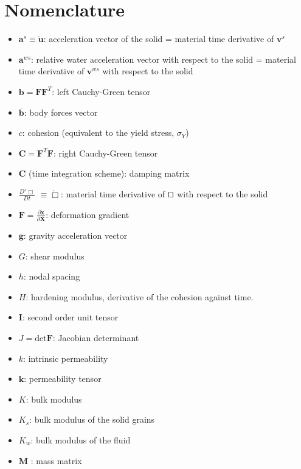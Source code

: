 \documentclass[twocolumn]{svjour3}          %
\begin{document}
\appendix

{}

\section{Nomenclature}
\label{ap:1}

\begin{itemize}
\item $\boldsymbol{a}^s \equiv \boldsymbol{\ddot{u}}$: acceleration vector of the solid = material time derivative of $\boldsymbol{v}^s$
\item $\boldsymbol{a}^{ws}$: relative water acceleration vector with respect to the solid = material time derivative of $\boldsymbol{v}^{ws}$ with respect to the solid 
\item $\boldsymbol{b}=\boldsymbol{F}\boldsymbol{F}^{T}$: left Cauchy-Green tensor
\item $\boldsymbol{\overline{b}}$: body forces vector
\item $c$: cohesion (equivalent to the yield stress, $\sigma_Y$)
\item $\boldsymbol{C}=\boldsymbol{F}^{T}\boldsymbol{F}$: right Cauchy-Green tensor
\item $\boldsymbol{C}$ (time integration scheme): damping matrix
\item $\frac{D^s\Box}{Dt}$ $\equiv \dot\Box$: material time derivative of $\qed$ with respect to the solid
\item $\boldsymbol{F}=\frac{\partial\boldsymbol{x}}{\partial\boldsymbol{X}}$: deformation gradient
\item $\boldsymbol{g}$: gravity acceleration vector
\item $G$: shear modulus
\item $h$: nodal spacing
\item $H$: hardening modulus, derivative of the cohesion against time.
\item $\boldsymbol{I}$: second order unit tensor
\item $J=\mbox{det}\boldsymbol{F}$: Jacobian determinant
\item $k$: intrinsic permeability
\item $\boldsymbol{k}$: permeability tensor
\item $K$: bulk modulus
\item $K_s$: bulk modulus of the solid grains
\item $K_w$: bulk modulus of the fluid
\item $\boldsymbol{M}$ : mass matrix

\end{itemize}
\end{document}
